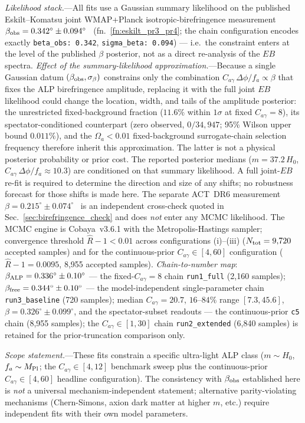 \documentclass[aps,prd,twocolumn,superscriptaddress,showpacs,preprintnumbers,nofootinbib,longbibliography,floatfix]{revtex4-2}
\newcommand{\MPl}{M_{\rm Pl}}
\begin{document}
\textit{Likelihood stack.}---All fits use a Gaussian summary likelihood on
the published Eskilt--Komatsu joint WMAP+Planck isotropic-birefringence
measurement
$\beta_{\rm obs}=0.342^\circ\pm0.094^\circ$~\cite{Eskilt2022}
(fn.~\ref{fn:eskilt_pr3_pr4}; the chain configuration encodes exactly
\texttt{beta\_obs: 0.342}, \texttt{sigma\_beta: 0.094})
--- i.e.\ the constraint enters at the level of the published
$\beta$ posterior, not as a direct re-analysis of the $EB$ spectra.
\emph{Effect of the summary-likelihood approximation.}---Because a single
Gaussian datum $(\beta_{\rm obs},\sigma_\beta)$ constrains only the
combination $C_{a\gamma}\,\Delta\phi/f_a\propto\beta$ that fixes the ALP
birefringence amplitude, replacing it with the full joint $EB$ likelihood
could change the location, width, and tails of the amplitude posterior: the
unrestricted fixed-background fraction ($11.6\%$ within $1\sigma$ at fixed
$C_{a\gamma}=8$), its spectator-conditioned counterpart (zero observed,
$0/34{,}947$;
95\% Wilson upper bound $0.011\%$), and the
$\Omega_a<0.01$ fixed-background surrogate-chain selection frequency
therefore inherit this approximation. The latter is not a physical posterior
probability or prior cost. The reported
posterior medians ($m=37.2\,H_0$, $C_{a\gamma}\,\Delta\phi/f_a\approx10.3$)
are conditioned on that summary likelihood. A full joint-$EB$ re-fit is
required to determine the direction and size of any shifts; no robustness
forecast for those shifts is made here. The
separate ACT~DR6 measurement
$\beta=0.215^\circ\pm0.074^\circ$~\cite{DiegoPalazuelos2025} is an
independent cross-check quoted in Sec.~\ref{sec:birefringence_check} and
does \emph{not} enter any MCMC likelihood. The MCMC
engine is Cobaya~v3.6.1 with the Metropolis-Hastings sampler; convergence
threshold $\hat R - 1 < 0.01$ across configurations (i)--(iii)
($N_{\rm tot}=9{,}720$ accepted samples) and for the
continuous-prior $C_{a\gamma}\in[4,60]$ configuration ($\hat R-1=0.0095$,
8{,}955 accepted samples).
\textit{Chain-to-number map}: $\beta_{\rm ALP}=0.336^\circ\pm0.10^\circ$
--- the fixed-$C_{a\gamma}=8$ chain \texttt{run1\_full} (2{,}160
samples); $\beta_{\rm free}=0.344^\circ\pm0.10^\circ$ --- the
model-independent single-parameter chain \texttt{run3\_baseline} (720
samples); median $C_{a\gamma}=20.7$,
$16$--$84\%$ range $[7.3,45.6]$, $\beta=0.326^\circ\pm0.099^\circ$, and the
spectator-subset readouts --- the continuous-prior \texttt{c5} chain
(8{,}955 samples); the $C_{a\gamma}\in[1,30]$ chain
\texttt{run2\_extended} (6{,}840 samples) is retained for the
prior-truncation comparison only.

\textit{Scope statement.}---These fits constrain a specific ultra-light
ALP class ($m\sim H_0$, $f_a\sim\MPl$; the $C_{a\gamma}\in[4,12]$ benchmark
sweep plus the continuous-prior $C_{a\gamma}\in[4,60]$ headline
configuration). The consistency with $\beta_{\rm obs}$ established here is
\emph{not} a universal mechanism-independent statement; alternative
parity-violating mechanisms (Chern-Simons, axion dark matter at higher
$m$, etc.) require independent fits with their own model parameters.



\end{document}

